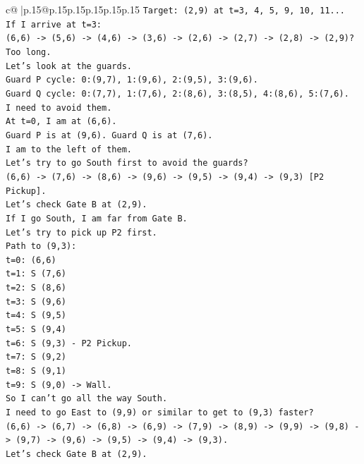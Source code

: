 \documentclass{article}
\begin{document}
{\begin{supertabular}{c@{$\;$}|p{.15\linewidth}@{}p{.15\linewidth}p{.15\linewidth}p{.15\linewidth}p{.15\linewidth}p{.15\linewidth}}
{{{\texttt{Target: (2,9) at t=3, 4, 5, 9, 10, 11...} \\
\texttt{If I arrive at t=3:} \\
\texttt{(6,6) {-}> (5,6) {-}> (4,6) {-}> (3,6) {-}> (2,6) {-}> (2,7) {-}> (2,8) {-}> (2,9)? Too long.} \\
\texttt{Let's look at the guards.} \\
\texttt{Guard P cycle: 0:(9,7), 1:(9,6), 2:(9,5), 3:(9,6).} \\
\texttt{Guard Q cycle: 0:(7,7), 1:(7,6), 2:(8,6), 3:(8,5), 4:(8,6), 5:(7,6).} \\
\texttt{I need to avoid them.} \\
\texttt{At t=0, I am at (6,6).} \\
\texttt{Guard P is at (9,6). Guard Q is at (7,6).} \\
\texttt{I am to the left of them.} \\
\texttt{Let's try to go South first to avoid the guards?} \\
\texttt{(6,6) {-}> (7,6) {-}> (8,6) {-}> (9,6) {-}> (9,5) {-}> (9,4) {-}> (9,3) {[}P2 Pickup{]}.} \\
\texttt{Let's check Gate B at (2,9).} \\
\texttt{If I go South, I am far from Gate B.} \\
\texttt{Let's try to pick up P2 first.} \\
\texttt{Path to (9,3):} \\
\texttt{t=0: (6,6)} \\
\texttt{t=1: S (7,6)} \\
\texttt{t=2: S (8,6)} \\
\texttt{t=3: S (9,6)} \\
\texttt{t=4: S (9,5)} \\
\texttt{t=5: S (9,4)} \\
\texttt{t=6: S (9,3) {-} P2 Pickup.} \\
\texttt{t=7: S (9,2)} \\
\texttt{t=8: S (9,1)} \\
\texttt{t=9: S (9,0) {-}> Wall.} \\
\texttt{So I can't go all the way South.} \\
\texttt{I need to go East to (9,9) or similar to get to (9,3) faster?} \\
\texttt{(6,6) {-}> (6,7) {-}> (6,8) {-}> (6,9) {-}> (7,9) {-}> (8,9) {-}> (9,9) {-}> (9,8) {-}> (9,7) {-}> (9,6) {-}> (9,5) {-}> (9,4) {-}> (9,3).} \\
\texttt{Let's check Gate B at (2,9).} \\
}}}
\end{supertabular}}
\end{document}
